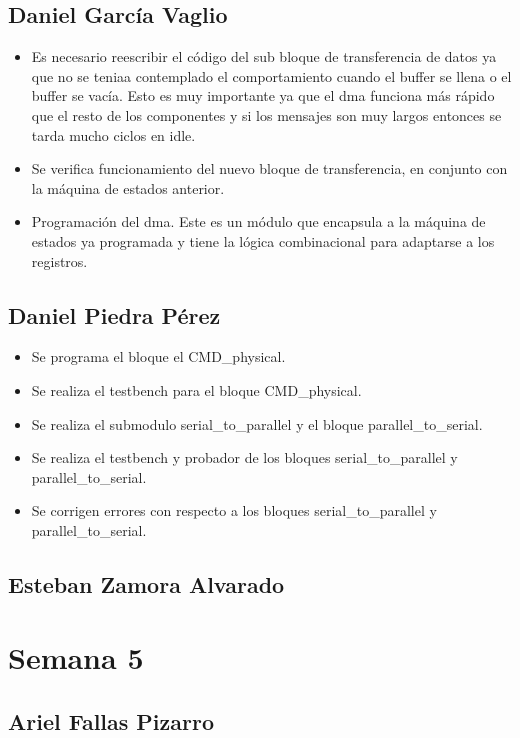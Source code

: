 \subsection{Daniel García Vaglio}
\begin{itemize}
\item Es necesario reescribir el código del sub bloque de transferencia de datos ya que no se teniaa
  contemplado el comportamiento cuando el buffer se llena o el buffer se vacía. Esto es muy
  importante ya que el dma funciona más rápido que el resto de los componentes y si los mensajes son
  muy largos entonces se tarda mucho ciclos en idle. 
\item Se verifica funcionamiento del nuevo bloque de transferencia, en conjunto con la máquina de
  estados anterior. 
\item Programación del dma. Este es un módulo que encapsula a la máquina de estados ya programada y
  tiene la lógica combinacional para adaptarse a los registros. 
\end{itemize}
\subsection{Daniel Piedra Pérez}
\begin{itemize}
\item Se programa el bloque el CMD\_physical.
\item Se realiza el testbench para el bloque CMD\_physical.
\item Se realiza el submodulo serial\_to\_parallel y el bloque parallel\_to\_serial.
\item Se realiza el testbench y probador de los bloques serial\_to\_parallel y parallel\_to\_serial.
\item Se corrigen errores con respecto a los bloques serial\_to\_parallel y parallel\_to\_serial.

\end{itemize}

\subsection{Esteban Zamora Alvarado}

\newpage

\section{Semana 5}
\subsection{Ariel Fallas Pizarro}


